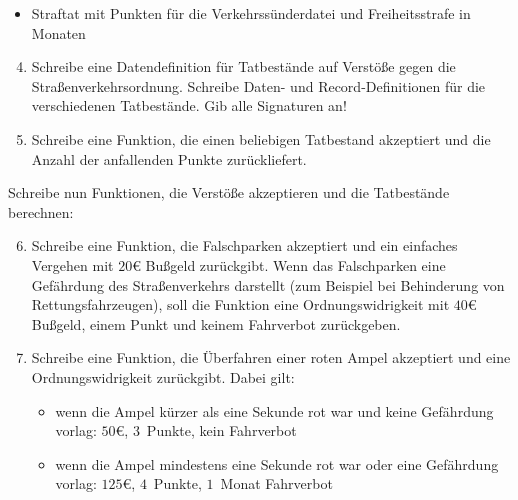 \begin{aufgabe}
\begin{itemize}
  \item Straftat mit Punkten für die Verkehrssünderdatei und
    Freiheitsstrafe in Monaten
  \end{itemize}
  
  \begin{enumerate} \setcounter{enumii}{3}
  \item Schreibe eine Datendefinition für
    Tatbestände auf Verstöße gegen die Straßenverkehrsordnung.
    Schreibe Daten- und Record-Definitionen für die verschiedenen
    Tatbestände.  Gib alle Signaturen an!

  \item Schreibe eine Funktion, die einen
    beliebigen Tatbestand akzeptiert und die Anzahl der anfallenden
    Punkte zurückliefert.
  \end{enumerate}

  Schreibe nun Funktionen, die Verstöße akzeptieren und die
  Tatbestände berechnen:

  \begin{enumerate} \setcounter{enumii}{5}
  \item Schreibe eine Funktion, die Falschparken
    akzeptiert und ein einfaches Vergehen mit $20$€ Bußgeld zurückgibt.
    Wenn das Falschparken eine Gefährdung des Straßenverkehrs
    darstellt (zum Beispiel bei Behinderung von Rettungsfahrzeugen),
    soll die Funktion eine Ordnungswidrigkeit mit $40$€ Bußgeld,
    einem Punkt und keinem Fahrverbot zurückgeben.

  \item Schreibe eine Funktion, die Überfahren
    einer roten Ampel akzeptiert und eine Ordnungswidrigkeit
    zurückgibt.  Dabei gilt:
    \begin{itemize}
    \item wenn die Ampel kürzer als eine Sekunde rot war und keine
      Gefährdung vorlag: $50$€, $3$~Punkte, kein Fahrverbot
    \item wenn die Ampel mindestens eine Sekunde rot war oder eine
      Gefährdung vorlag: $125$€, $4$~Punkte, $1$~Monat Fahrverbot
    \end{itemize}


\end{enumerate}
\end{aufgabe}
